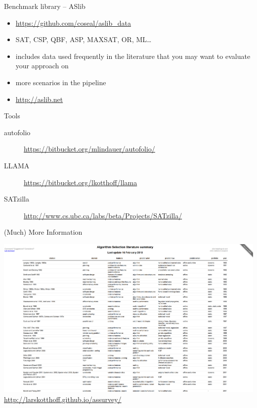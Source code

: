 \begin{frame}[c]{Benchmark library -- ASlib}
\begin{itemize}
\item \url{https://github.com/coseal/aslib_data}
\item SAT, CSP, QBF, ASP, MAXSAT, OR, ML\ldots
\item includes data used frequently in the literature that you may want to
    evaluate your approach on
\item more scenarios in the pipeline
\item \url{http://aslib.net}\\[1em]
\end{itemize}
\end{frame}

\begin{frame}[c]{Tools}
\begin{description}
\item[autofolio] \url{https://bitbucket.org/mlindauer/autofolio/}
\item[LLAMA] \url{https://bitbucket.org/lkotthoff/llama}
\item[SATzilla]
 \footnotesize{\url{http://www.cs.ubc.ca/labs/beta/Projects/SATzilla/}}
\end{description}
\end{frame}

\begin{frame}[c]{(Much) More Information}
\begin{center}
\includegraphics[height=.6\textheight]{survey}\\
\url{http://larskotthoff.github.io/assurvey/}
\end{center}
\end{frame}


